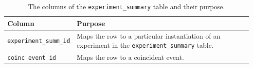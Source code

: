 \begin{table}
\label{tab:experiment_map}
\center
\begin{tabular}{ l | p{9cm}}
Column      &   Purpose     \\
\hline \hline
\texttt{experiment\_summ\_id}   &   Maps the row to a particular instantiation of an experiment in the \texttt{experiment\_summary} table. \\
\hline
\texttt{coinc\_event\_id}   &   Maps the row to a coincident event.
\end{tabular}
\caption{The columns of the \texttt{experiment\_summary} table and their purpose.}
\end{table}

